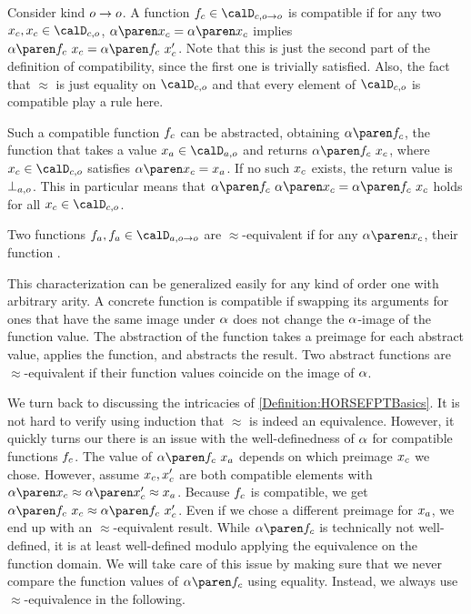 \documentclass[../../diss.tex]{subfiles}
\begin{document}
\begin{example}%
\label{Example:HORSEFPTBasicDefinitions}%
    Consider kind $o \to o$.
    A function $\fc \in \domainc{\ground \to \ground}$ is compatible if for any two $\xc,\xc \in \domainc{\ground}$, $\abs{\xc} = \abs{\xc}$ implies $\abs{\fc \appl \xc} = \abs{\fc \appl \xc'}$.
    Note that this is just the second part of the definition of compatibility, since the first one is trivially satisfied.
    Also, the fact that $\approx$ is just equality on $\domainc{\ground}$ and that every element of $\domainc{\ground}$ is compatible play a rule here.

    Such a compatible function $f_c$ can be abstracted, obtaining $\abs{\fc}$, the function that takes a value $\xa \in \domaina{\ground}$ and returns $\abs{\fc \appl \xc}$, where $\xc \in \domainc{\ground}$ satisfies $\abs{\xc} = \xa$.
    If no such $x_c$ exists, the return value is $\bota{\ground}$.
    This in particular means that $\abs{\fc} \appl \abs{\xc} = \abs{\fc \appl \xc}$ holds for all $\xc \in \domainc{\ground}$.

    Two functions $\fa,\fa \in \domaina{\ground \to \ground}$ are $\approx$-equivalent if for any $\abs{\xc}$, their function .

    This characterization can be generalized easily for any kind of order one with arbitrary arity.
    A concrete function is compatible if swapping its arguments for ones that have the same image under $\abs$ does not change the $\abs$-image of the function value.
    The abstraction of the function takes a preimage for each abstract value, applies the function, and abstracts the result.
    Two abstract functions are $\approx$-equivalent if their function values coincide on the image of $\abs$.
\end{example}

We turn back to discussing the intricacies of \cref{Definition:HORSEFPTBasics}.
It is not hard to verify using induction that $\approx$ is indeed an equivalence.
However, it quickly turns our there is an issue with the well-definedness of $\abs$ for compatible functions $f_c$.
The value of $\abs{\fc} \appl \xa$ depends on which preimage $x_c$ we chose.
However, assume $x_c, x_c'$ are both compatible elements with $\abs{\xc} \approx \abs{\xc'} \approx \xa$.
Because $f_c$ is compatible, we get $\abs{\fc \appl \xc} \approx \abs{\fc \appl \xc'}$.
Even if we chose a different preimage for $x_a$, we end up with an $\approx$-equivalent result.
While $\abs{\fc}$ is technically not well-defined, it is at least well-defined modulo applying the equivalence on the function domain.
We will take care of this issue by making sure that we never compare the function values of $\abs{\fc}$ using equality.
Instead, we always use $\approx$-equivalence in the following.
\end{document}
